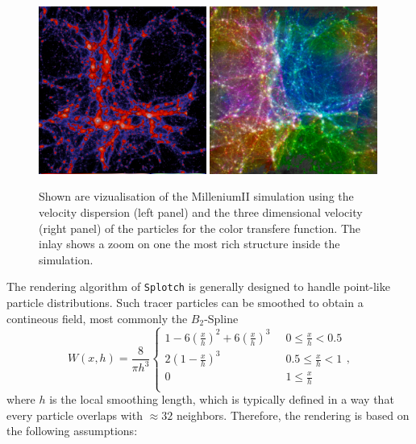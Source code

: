 \begin{figure}
\begin{center}
\includegraphics[width=0.49\textwidth]{millenium2_veldisp.pdf}
\includegraphics[width=0.49\textwidth]{millenium2_vel.pdf}
\end{center}
\caption{Shown are vizualisation of the MilleniumII simulation \cite{2009MNRAS.398.1150B} using
the velocity dispersion (left panel) and the three dimensional velocity (right panel) of the
particles for the color transfere function. The inlay shows a zoom on one the most rich structure
inside the simulation.}\label{mil2}
\end{figure}

The rendering algorithm of {\tt Splotch} is generally designed to handle
point-like particle distributions. Such tracer particles can be smoothed
to obtain a contineous field, most commonly the $B_2$-Spline \cite{1985A&A...149..135M}
\begin{equation}
   W(x,h)=\frac{8}{\pi h^3}\left\{\begin{array}{ll}
      1 - 6 \left(\frac{x}{h}\right)^2 + 6 \left(\frac{x}{h}\right)^3 \;\;& 0 \le \frac{x}{h} < 0.5 \\
      2 \left(1 - \frac{x}{h}\right)^3                              & 0.5 \le \frac{x}{h} < 1 \\
      0                                                             & 1 \le \frac{x}{h} \\
   \end{array} \right. , \label{SPH:kern}
\end{equation}
where $h$ is the local smoothing length, which is typically defined in a way
that every particle overlaps with $\approx 32$ neighbors. Therefore, the rendering is
based on the following assumptions:

